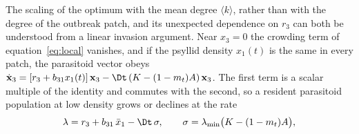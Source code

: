 The scaling of the optimum with the mean degree $\langle k\rangle$, rather than with the degree of the outbreak patch, and its unexpected dependence on $r_3$ can both be understood from a linear invasion argument. Near $x_3 = 0$ the crowding term of equation~\eqref{eq:local} vanishes, and if the psyllid density $x_1(t)$ is the same in every patch, the parasitoid vector obeys $\dot{\mathbf{x}}_3 = [r_3 + b_{31}x_1(t)]\,\mathbf{x}_3 - \Dt\,(K - (1-m_t)A)\,\mathbf{x}_3$. The first term is a scalar multiple of the identity and commutes with the second, so a resident parasitoid population at low density grows or declines at the rate
\begin{equation}
  \lambda = r_3 + b_{31}\,\bar{x}_1 - \Dt\,\sigma, \qquad
  \sigma = \lambda_{\min}\bigl(K - (1-m_t)A\bigr),
  \label{eq:invasion}
\end{equation}
